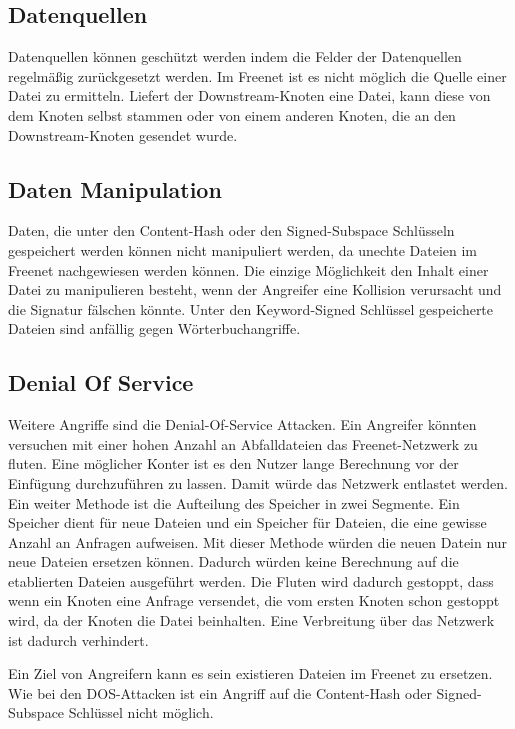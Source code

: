 \subsection{Datenquellen}
Datenquellen können geschützt werden indem die Felder der Datenquellen
regelmäßig zurückgesetzt werden.  Im Freenet ist es nicht möglich die Quelle
einer Datei zu ermitteln. Liefert der Downstream-Knoten eine Datei, kann diese
von dem Knoten selbst stammen oder von einem anderen Knoten, die an den
Downstream-Knoten gesendet wurde.

\subsection{Daten Manipulation}
Daten, die unter den Content-Hash oder den Signed-Subspace Schlüsseln
gespeichert werden können nicht manipuliert werden, da unechte Dateien im
Freenet nachgewiesen werden können. Die einzige Möglichkeit den Inhalt einer
Datei zu manipulieren besteht, wenn der Angreifer eine Kollision verursacht und
die Signatur fälschen könnte. Unter den Keyword-Signed Schlüssel gespeicherte
Dateien sind anfällig gegen Wörterbuchangriffe.

\subsection{Denial Of Service}
Weitere Angriffe sind die Denial-Of-Service Attacken. Ein Angreifer könnten
versuchen mit einer hohen Anzahl an Abfalldateien das Freenet-Netzwerk zu
fluten. Eine möglicher Konter ist es den Nutzer lange Berechnung vor der
Einfügung durchzuführen zu lassen. Damit würde das Netzwerk entlastet werden.
Ein weiter Methode ist die Aufteilung des Speicher in zwei Segmente.
Ein Speicher dient für neue Dateien und ein Speicher für Dateien, die eine
gewisse Anzahl an Anfragen aufweisen. Mit dieser Methode würden die neuen Datein
nur neue Dateien ersetzen können. Dadurch würden keine Berechnung auf die
etablierten Dateien ausgeführt werden. Die Fluten wird dadurch gestoppt, dass
wenn ein Knoten eine Anfrage versendet, die vom ersten Knoten schon gestoppt
wird, da der Knoten die Datei beinhalten. Eine Verbreitung über das Netzwerk
ist dadurch verhindert.

Ein Ziel von Angreifern kann es sein existieren Dateien im Freenet zu ersetzen.
Wie bei den DOS-Attacken ist ein Angriff auf die Content-Hash oder
Signed-Subspace Schlüssel nicht möglich.
